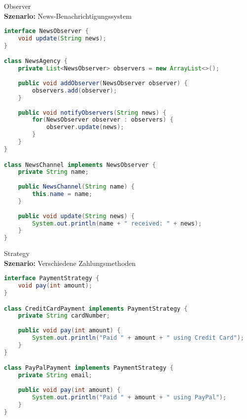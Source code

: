 \begin{example}{Observer}\\
\textbf{Szenario:} News-Benachrichtigungssystem
\begin{lstlisting}[language=Java, style=base]
interface NewsObserver {
    void update(String news);
}

class NewsAgency {
    private List<NewsObserver> observers = new ArrayList<>();
    
    public void addObserver(NewsObserver observer) {
        observers.add(observer);
    }
    
    public void notifyObservers(String news) {
        for(NewsObserver observer : observers) {
            observer.update(news);
        }
    }
}

class NewsChannel implements NewsObserver {
    private String name;
    
    public NewsChannel(String name) {
        this.name = name;
    }
    
    public void update(String news) {
        System.out.println(name + " received: " + news);
    }
}
\end{lstlisting}
\end{example}

\begin{example}{Strategy}\\
\textbf{Szenario:} Verschiedene Zahlungsmethoden
\begin{lstlisting}[language=Java, style=base]
interface PaymentStrategy {
    void pay(int amount);
}

class CreditCardPayment implements PaymentStrategy {
    private String cardNumber;
    
    public void pay(int amount) {
        System.out.println("Paid " + amount + " using Credit Card");
    }
}

class PayPalPayment implements PaymentStrategy {
    private String email;
    
    public void pay(int amount) {
        System.out.println("Paid " + amount + " using PayPal");
    }
}
\end{lstlisting}
\end{example}

